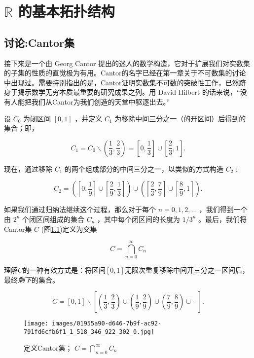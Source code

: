 \chapter{\(\mathbb{R}\) 的基本拓扑结构}
\label{chap:3}
\section{讨论:Cantor集}
\label{sec:3.1}

接下来是一个由 Georg Cantor 提出的迷人的数学构造，它对于扩展我们对实数集的子集的性质的直觉极为有用。Cantor的名字已经在第一章关于不可数集的讨论中出现过。需要特别指出的是，Cantor证明实数集不可数的突破性工作，已然跻身于揭示数学无穷本质最重要的研究成果之列。用 David Hilbert 的话来说，“没有人能把我们从Cantor为我们创造的天堂中驱逐出去。”

设 \({C}_{0}\) 为闭区间 \(\left\lbrack  {0,1}\right\rbrack\) ，并定义 \({C}_{1}\) 为移除中间三分之一（的开区间）后得到的集合；即，

\[
{C}_{1} = {C}_{0} \smallsetminus  \left( {\frac{1}{3},\frac{2}{3}}\right)  = \left\lbrack  {0,\frac{1}{3}}\right\rbrack   \cup  \left\lbrack  {\frac{2}{3},1}\right\rbrack  .
\]

现在，通过移除 \({C}_{1}\) 的两个组成部分的中间三分之一，以类似的方式构造 \({C}_{2}\) :

\[
{C}_{2} = \left( {\left\lbrack  {0,\frac{1}{9}}\right\rbrack   \cup  \left\lbrack  {\frac{2}{9},\frac{1}{3}}\right\rbrack  }\right)  \cup  \left( {\left\lbrack  {\frac{2}{3},\frac{7}{9}}\right\rbrack   \cup  \left\lbrack  {\frac{8}{9},1}\right\rbrack  }\right) .
\]

如果我们通过归纳法继续这个过程，那么对于每个 \(n = 0,1,2,\ldots\) ，我们得到一个由 \({2}^{n}\) 个闭区间组成的集合 \({C}_{n}\) ，其中每个闭区间的长度为 \(1/{3}^{n}\) 。最后，我们将Cantor集 \(C\) (图\ref{fig:3.1})定义为交集

\[
C = \mathop{\bigcap }\limits_{{n = 0}}^{\infty }{C}_{n}
\]

理解$C$的一种有效方式是：将区间$[0,1]$无限次重复移除中间开三分之一区间后，最终\textit{剩下}的集合。

\[
C = \left\lbrack  {0,1}\right\rbrack   \smallsetminus  \left\lbrack  {\left( {\frac{1}{3},\frac{2}{3}}\right)  \cup  \left( {\frac{1}{9},\frac{2}{9}}\right)  \cup  \left( {\frac{7}{9},\frac{8}{9}}\right)  \cup  \cdots }\right\rbrack  .
\]


\begin{figure}[h]
  \centering
  \texttt{[image: images/01955a90-d646-7b9f-ac92-791fd6cfb6f1\_1\_518\_346\_922\_302\_0.jpg]}
  \caption{定义Cantor集； \(C = \mathop{\bigcap }\limits_{{n = 0}}^{\infty }{C}_{n}\) }
  \label{fig:3.1}
\end{figure}


